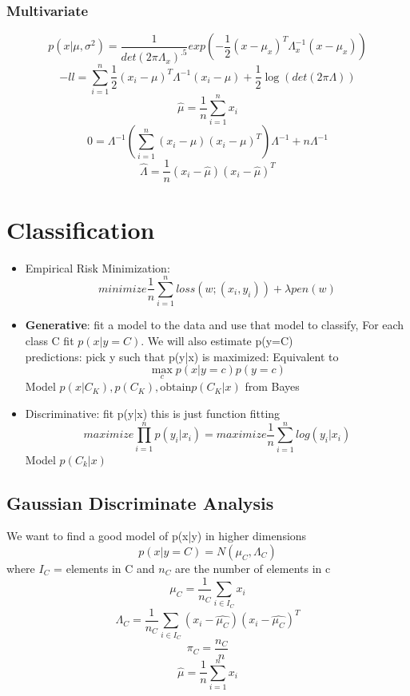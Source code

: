 \documentclass{article}
\begin{document}
\subsubsection{Multivariate}
$$p(x|\mu,\sigma^2) = \frac{1}{det(2\pi \Lambda_x)^{.5}} exp(-\frac{1}{2}(x-\mu_x)^T \Lambda_x^{-1} (x-\mu_x))$$
$$-ll = \sum_{i=1}^n \frac{1}{2} (x_i-\mu)^T \Lambda^{-1} (x_i - \mu) + \frac{1}{2}\log(det(2\pi \Lambda))$$
$$\hat{\mu} = \frac{1}{n} \sum_{i=1}^n x_i$$
$$0 = \Lambda^{-1} (\sum_{i=1}^n (x_i - \mu)(x_i - \mu)^T) \Lambda^{-1} + n\Lambda^{-1}$$
$$\hat{\Lambda} = \frac{1}{n} (x_i - \hat{\mu})(x_i - \hat{\mu})^T$$

\section{Classification}
\begin{itemize}
\item Empirical Risk Minimization:
$$minimize \frac{1}{n} \sum_{i=1}^n loss(w; (x_i,y_i)) + \lambda pen(w)$$
\item \textbf{Generative}: fit a model to the data and use that model to classify, For each class C fit $p(x|y=C)$. We will also estimate p(y=C) \\
predictions: pick y such that p(y|x) is maximized: Equivalent to $$\max_c p(x|y=c) p(y=c)$$
Model $p(x|C_K), p(C_K), \textrm{obtain} p(C_K|x)$ from Bayes
\item Discriminative: fit p(y|x) this is just function fitting
$$maximize \prod_{i=1}^n p(y_i|x_i) = maximize \frac{1}{n} \sum_{i=1}^n log(y_i|x_i)$$
Model $p(C_k|x)$
\end{itemize}

\subsection{Gaussian Discriminate Analysis}
We want to find a good model of p(x|y) in higher dimensions
$$p(x|y=C) = N(\mu_C,\Lambda_C)$$ where $I_C$ = elements in C and $n_C$ are the number of elements in c
$$\mu_C = \frac{1}{n_C} \sum_{i \in I_C} x_i$$
$$\Lambda_C = \frac{1}{n_C} \sum_{i \in I_C} (x_i - \hat{\mu_C})(x_i - \hat{\mu_C})^T$$
$$\pi_C = \frac{n_C}{n}$$
$$\hat{\mu} = \frac{1}{n} \sum_{i=1}^n x_i$$
\end{document}
